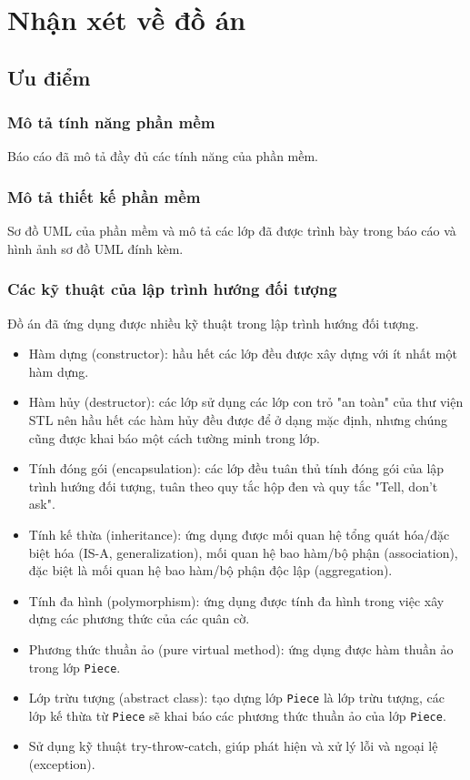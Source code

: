 \section{Nhận xét về đồ án}
\subsection{Ưu điểm}
\subsubsection{Mô tả tính năng phần mềm}
Báo cáo đã mô tả đầy đủ các tính năng của phần mềm.

\subsubsection{Mô tả thiết kế phần mềm}
Sơ đồ UML của phần mềm và mô tả các lớp đã được trình bày trong báo cáo và hình ảnh sơ đồ UML đính kèm.

\subsubsection{Các kỹ thuật của lập trình hướng đối tượng}
Đồ án đã ứng dụng được nhiều kỹ thuật trong lập trình hướng đối tượng.
\begin{itemize}
\item Hàm dựng (constructor): hầu hết các lớp đều được xây dựng với ít nhất một hàm dựng.
\item Hàm hủy (destructor): các lớp sử dụng các lớp con trỏ "an toàn" của thư viện STL nên hầu hết các hàm hủy đều được để ở dạng mặc định, nhưng chúng cũng được khai báo một cách tường minh trong lớp.
\item Tính đóng gói (encapsulation): các lớp đều tuân thủ tính đóng gói của lập trình hướng đối tượng, tuân theo quy tắc hộp đen và quy tắc "Tell, don't ask".
\item Tính kế thừa (inheritance): ứng dụng được mối quan hệ tổng quát hóa/đặc biệt hóa (IS-A, generalization), mối quan hệ bao hàm/bộ phận (association), đặc biệt là mối quan hệ bao hàm/bộ phận độc lập (aggregation).
\item Tính đa hình (polymorphism): ứng dụng được tính đa hình trong việc xây dựng các phương thức của các quân cờ.
\item Phương thức thuần ảo (pure virtual method): ứng dụng được hàm thuần ảo trong lớp \lstinline{Piece}. 
\item Lớp trừu tượng (abstract class): tạo dựng lớp \lstinline{Piece} là lớp trừu tượng, các lớp kế thừa từ \lstinline{Piece} sẽ khai báo các phương thức thuần ảo của lớp \lstinline{Piece}.
\item Sử dụng kỹ thuật try-throw-catch, giúp phát hiện và xử lý lỗi và ngoại lệ (exception).
\end{itemize}

